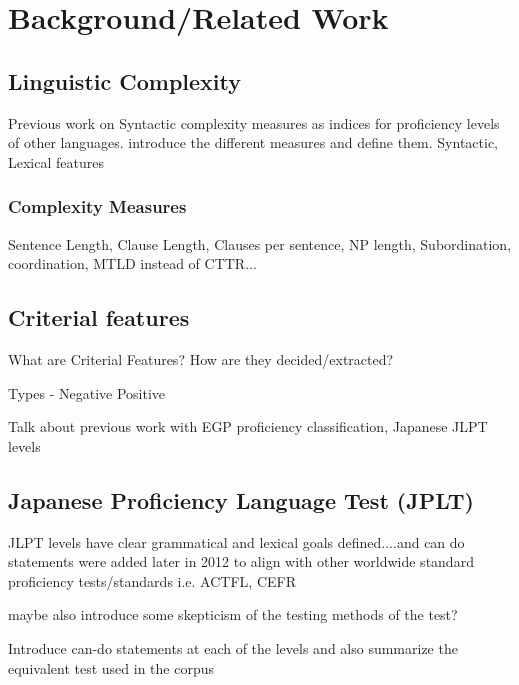 \chapter{Background/Related Work}
\section{Linguistic Complexity}
Previous work on Syntactic complexity measures as indices for proficiency levels of other languages.
introduce the different measures and define them.
Syntactic, Lexical features

\subsection{Complexity Measures}
Sentence Length, Clause Length, Clauses per sentence, NP length, Subordination, coordination, MTLD instead of CTTR...


\section{Criterial features}
What are Criterial Features? How are they decided/extracted?

Types - Negative Positive

Talk about previous work with EGP proficiency classification, Japanese JLPT levels

\section{Japanese Proficiency Language Test (JPLT)}
JLPT levels have clear grammatical and lexical goals defined....and can do statements were added later in 2012 to align with other worldwide standard proficiency tests/standards i.e. ACTFL, CEFR

maybe also introduce some skepticism of the testing methods of the test? 

Introduce can-do statements at each of the levels and also summarize the equivalent test used in the corpus